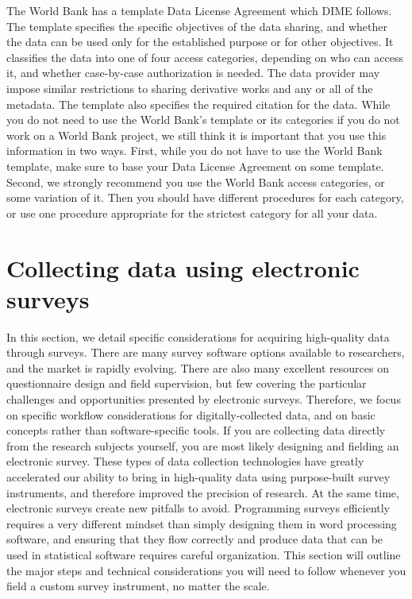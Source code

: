 The World Bank has a template Data License Agreement which DIME follows.
The template specifies the specific objectives of the data sharing,
and whether the data can be used only for the established purpose or for other objectives.
It classifies the data into one of four access categories,
depending on who can access it,
and whether case-by-case authorization is needed.
The data provider may impose similar restrictions
to sharing derivative works and any or all of the metadata.
The template also specifies the required citation for the data.
While you do not need to use the World Bank's template
or its categories if you do not work on a World Bank project,
we still think it is important that you use this information in two ways.
First, while you do not have to use the World Bank template,
make sure to base your Data License Agreement on some template.
Second, we strongly recommend you use the World Bank access categories,
or some variation of it.
Then you should have different procedures for each category,
or use one procedure appropriate for the strictest category for all your data.

\section{Collecting data using electronic surveys}
In this section, we detail specific considerations
for acquiring high-quality data through surveys.
There are many survey software options available to researchers,
and the market is rapidly evolving.
There are also many excellent resources on questionnaire design and field supervision,
but few covering the particular challenges and opportunities presented by electronic surveys.
Therefore, we focus on specific workflow considerations for digitally-collected data,
and on basic concepts rather than software-specific tools.
If you are collecting data directly from the research subjects yourself,
you are most likely designing and fielding an electronic survey.
These types of data collection technologies
have greatly accelerated our ability to bring in high-quality data
using purpose-built survey instruments,
and therefore improved the precision of research.
At the same time, electronic surveys create new pitfalls to avoid.
Programming surveys efficiently requires a very different mindset
than simply designing them in word processing software,
and ensuring that they flow correctly and produce data
that can be used in statistical software requires careful organization.
This section will outline the major steps and technical considerations
you will need to follow whenever you field a custom survey instrument,
no matter the scale.


